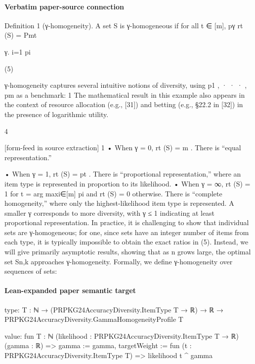 \documentclass[10pt]{article}
\begin{document}
\paragraph{Verbatim paper-source connection}
\begin{ReviewVerbatim}
Definition 1 (γ-homogeneity). A set S is γ-homogeneous if for all t ∈ [m],
pγ
rt (S) = Pmt

γ.
i=1 pi

(5)

γ-homogeneity captures several intuitive notions of diversity, using p1 , · · · , pm as a benchmark:
1 The mathematical result in this example also appears in the context of resource allocation (e.g., [31]) and betting (e.g.,
§22.2 in [32]) in the presence of logarithmic utility.

4


[form-feed in source extraction]
1
• When γ = 0, rt (S) = m
. There is “equal representation.”

• When γ = 1, rt (S) = pt . There is “proportional representation,” where an item type is represented in
proportion to its likelihood.
• When γ = ∞, rt (S) = 1 for t = arg maxi∈[m] pi and rt (S) = 0 otherwise. There is “complete homogeneity,”
where only the highest-likelihood item type is represented.
A smaller γ corresponds to more diversity, with γ ≤ 1 indicating at least proportional representation. In
practice, it is challenging to show that individual sets are γ-homogeneous; for one, since sets have an integer
number of items from each type, it is typically impossible to obtain the exact ratios in (5). Instead, we will give
primarily asymptotic results, showing that as n grows large, the optimal set Sn,k approaches γ-homogeneity.
Formally, we define γ-homogeneity over sequences of sets:
\end{ReviewVerbatim}



\paragraph{Lean-expanded paper semantic target}
\begin{ReviewVerbatim}
type:
{T : ℕ} → (PRPKG24AccuracyDiversity.ItemType T → ℝ) → ℝ → PRPKG24AccuracyDiversity.GammaHomogeneityProfile T

value:
fun {T : ℕ} (likelihood : PRPKG24AccuracyDiversity.ItemType T → ℝ) (gamma : ℝ) =>
  { gamma := gamma, targetWeight := fun (t : PRPKG24AccuracyDiversity.ItemType T) => likelihood t ^ gamma }
\end{ReviewVerbatim}
\end{document}
